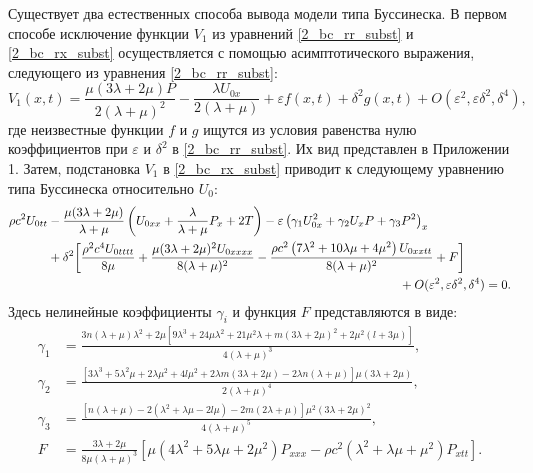 \documentclass[12pt, a4paper]{report}
\begin{document}
Существует два естественных способа вывода модели типа Буссинеска. В первом способе исключение функции $V_1$ из уравнений \eqref{2_bc_rr_subst} и \eqref{2_bc_rx_subst} осуществляется с помощью асимптотического выражения, следующего из уравнения \eqref{2_bc_rr_subst}:
\begin{equation} \label{v1_asympt}
V_1(x, t) = \frac{\mu(3\lambda + 2\mu) P}{2(\lambda + \mu)^2} - \frac{\lambda U_{0x}}{2(\lambda + \mu)} + \varepsilon f(x,t) + \delta^2 g(x,t) + O(\varepsilon^2, \varepsilon\delta^2, \delta^4),
\end{equation}
где неизвестные функции $f$ и $g$ ищутся из условия равенства нулю коэффициентов при $\varepsilon$ и $\delta^2$ в \eqref{2_bc_rr_subst}. Их вид представлен в Приложении 1. Затем, подстановка $V_1$ в \eqref{2_bc_rx_subst} приводит к следующему уравнению типа Буссинеска относительно $U_0$:
\begin{equation} \label{eq_u0_asympt}
\begin{split}
\rho c^2 U_{0tt} &- \frac{\mu(3\lambda + 2\mu)}{\lambda + \mu}\left(U_{0xx} + \frac{\lambda}{\lambda + \mu} P_x + 2T\right) - \varepsilon \left(\gamma_1 U_{0x}^2 + \gamma_2 U_x P + \gamma_3 P^2 \right)_x \\
&+ \delta^2 \bigg[\frac{\rho ^2 c^4 U_{0tttt}}{8\mu} + \frac{\mu (3\lambda + 2\mu)^2 U_{0xxxx}}{8(\lambda + \mu)^2} - \frac{\rho c^2 \left(7\lambda^2 + 10\lambda\mu + 4\mu^2\right) U_{0xxtt}}{8(\lambda + \mu)^2} + F \bigg]\\
&\hspace{100mm}+ O(\varepsilon^2, \varepsilon\delta^2, \delta^4) = 0.
\end{split}
\end{equation}
Здесь нелинейные коэффициенты $\gamma_i$ и функция $F$ представляются в виде:
\begin{align} 
	\nonumber
	\gamma_1 &= \frac{3n(\lambda + \mu)\lambda^2 + 2\mu \left[9\lambda^3 + 24\mu\lambda^2 + 21\mu^2\lambda + m(3\lambda + 2\mu)^2 + 2\mu^2 (l + 3\mu)\right]}{4 (\lambda + \mu)^3},\\
	\nonumber
	\gamma_2 &= \frac{\left[3\lambda^3 + 5\lambda^2\mu + 2\lambda\mu^2 + 4l\mu^2 + 2\lambda m(3\lambda + 2\mu) - 2\lambda n (\lambda + \mu)\right] \mu(3\lambda + 2\mu)}{2(\lambda + \mu)^4},\\
	\nonumber
	\gamma_3 &= \frac{\left[n (\lambda +\mu )-2 \left(\lambda ^2+\lambda  \mu -2 l \mu \right)-2 m (2 \lambda +\mu )\right] \mu^2 (3\lambda + 2\mu)^2}{4(\lambda + \mu)^5},\\
	\nonumber
	F &= \frac{3\lambda + 2\mu}{8\mu(\lambda + \mu)^3}\left[ \mu (4\lambda^2 + 5\lambda\mu + 2\mu^2) P_{xxx} - \rho c^2(\lambda^2 + \lambda\mu + \mu^2) P_{xtt}\right].
\end{align}
\end{document}

